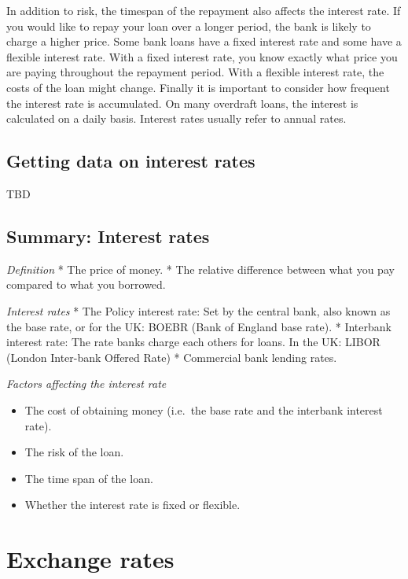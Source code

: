 \documentclass[]{book}
\providecommand{\tightlist}{%
  \setlength{\itemsep}{0pt}\setlength{\parskip}{0pt}}
\begin{document}
In addition to risk, the timespan of the repayment also affects the interest rate. If you would like to repay your loan over a longer period, the bank is likely to charge a higher price. Some bank loans have a fixed interest rate and some have a flexible interest rate. With a fixed interest rate, you know exactly what price you are paying throughout the repayment period. With a flexible interest rate, the costs of the loan might change. Finally it is important to consider how frequent the interest rate is accumulated. On many overdraft loans, the interest is calculated on a daily basis. Interest rates usually refer to annual rates.

\hypertarget{getting-data-on-interest-rates}{%
\subsection{Getting data on interest rates}\label{getting-data-on-interest-rates}}

TBD

\hypertarget{summary-interest-rates}{%
\subsection{Summary: Interest rates}\label{summary-interest-rates}}

\emph{Definition}
* The price of money.
* The relative difference between what you pay compared to what you borrowed.

\emph{Interest rates}
* The Policy interest rate: Set by the central bank, also known as the base rate, or for the UK: BOEBR (Bank of England base rate).
* Interbank interest rate: The rate banks charge each others for loans. In the UK: LIBOR (London Inter-bank Offered Rate)
* Commercial bank lending rates.

\emph{Factors affecting the interest rate}

\begin{itemize}
\tightlist
\item
  The cost of obtaining money (i.e.~the base rate and the interbank interest rate).
\item
  The risk of the loan.
\item
  The time span of the loan.
\item
  Whether the interest rate is fixed or flexible.
\end{itemize}

\hypertarget{exchange-rates}{%
\section{Exchange rates}\label{exchange-rates}}
\end{document}
